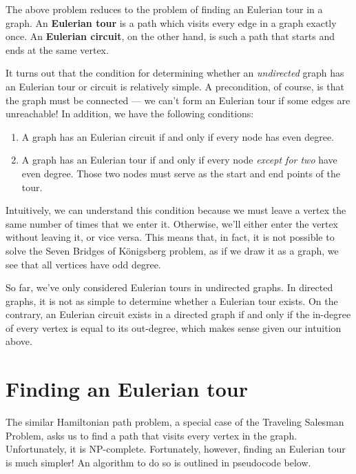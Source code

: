 \documentclass{article}
\begin{document}
The above problem reduces to the problem of finding an Eulerian tour in a graph. An \textbf{Eulerian tour} is a path which visits every edge in a graph exactly once. An \textbf{Eulerian circuit}, on the other hand, is such a path that starts and ends at the same vertex.

It turns out that the condition for determining whether an \textit{undirected} graph has an Eulerian tour or circuit is relatively simple. A precondition, of course, is that the graph must be connected --- we can't form an Eulerian tour if some edges are unreachable! In addition, we have the following conditions: 

\begin{enumerate}
    \item A graph has an Eulerian circuit if and only if every node has even degree.
    \item A graph has an Eulerian tour if and only if every node \textit{except for two} have even degree. Those two nodes must serve as the start and end points of the tour.
\end{enumerate}

Intuitively, we can understand this condition because we must leave a vertex the same number of times that we enter it. Otherwise, we'll either enter the vertex without leaving it, or vice versa. This means that, in fact, it is not possible to solve the Seven Bridges of K\"{o}nigsberg problem, as if we draw it as a graph, we see that all vertices have odd degree.

So far, we've only considered Eulerian tours in undirected graphs. In directed graphs, it is not as simple to determine whether a Eulerian tour exists. On the contrary, an Eulerian circuit exists in a directed graph if and only if the in-degree of every vertex is equal to its out-degree, which makes sense given our intuition above.

\newpage

\section{Finding an Eulerian tour}

The similar Hamiltonian path problem, a special case of the Traveling Salesman Problem, asks us to find a path that visits every vertex in the graph. Unfortunately, it is NP-complete. Fortunately, however, finding an Eulerian tour is much simpler! An algorithm to do so is outlined in pseudocode below.
\end{document}
